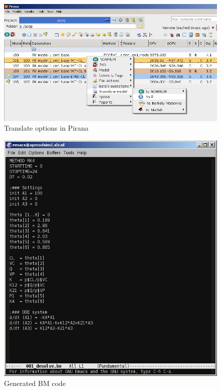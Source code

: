 \begin{figure}[h] \centering
    \includegraphics[scale=.4]{images/ODE_1.jpg}
    \caption{Translate options in Pirana \label{fig:Fig1}}
\end{figure}

\begin{figure}[h] \centering
    \includegraphics[scale=.5]{images/ODE_2.jpg}
    \caption{Generated BM code \label{fig:Fig2}}
\end{figure}

